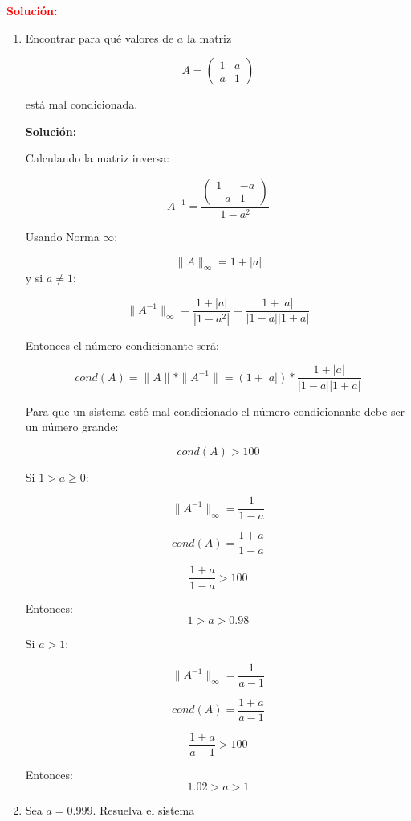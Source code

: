   
 \noindent \textcolor{red}{\bf Solución:}
 \begin{enumerate}[label=(\alph*)]
    \item Encontrar para qué valores de $a$ la matriz
    
    $$A = \begin{pmatrix}
                1 & a \\ 
                a & 1
            \end{pmatrix}$$
    
    está mal condicionada.
    
    \textbf{Solución:}
    
    Calculando la matriz inversa:
    
    $$
    A^{-1}=\frac{\begin{pmatrix}
                1 & -a\\ 
                -a & 1
            \end{pmatrix}}{1-a^2}
    $$
    
    Usando Norma $\infty$:
    
    $$
    \|A\|_{\infty}=1+|a|
    $$ y si $a\neq 1$:
    
    $$
    \|A^{-1}\|_{\infty}=\frac{1+|a|}{|1-a^2|}=\frac{1+|a|}{|1-a||1+a|}
    $$
    
    Entonces el número condicionante será:
    
    $$
    cond(A)=\|A\|*\|A^{-1}\|=(1+|a|)*\frac{1+|a|}{|1-a||1+a|}
    $$
    
    Para que un sistema esté mal condicionado el número condicionante debe ser un número grande:
    
    $$
    cond(A)>100
    $$
    
    Si $1>a\geq0$:
    
    $$
    \|A^{-1}\|_{\infty}=\frac{1}{1-a}
    $$
    
    $$
    cond(A)=\frac{1+a}{1-a}
    $$
    
    $$
    \frac{1+a}{1-a}>100
    $$
    
    Entonces:
    $$
    1>a>0.98
    $$
    
    Si $a>1$:
    
    $$
    \|A^{-1}\|_{\infty}=\frac{1}{a-1}
    $$
    
    $$
    cond(A)=\frac{1+a}{a-1}
    $$
    
    $$
    \frac{1+a}{a-1}>100
    $$
    
    Entonces:
    $$
    1.02>a>1
    $$
    
    \item Sea $a=0.999$. Resuelva el sistema
    

\end{enumerate}
